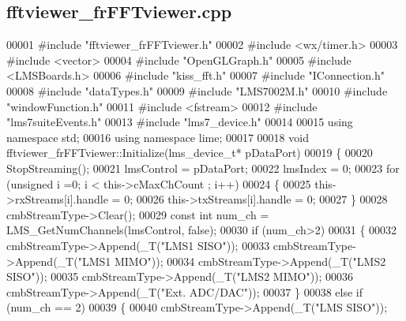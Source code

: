 \subsection{fftviewer\+\_\+fr\+F\+F\+Tviewer.\+cpp}
\label{fftviewer__frFFTviewer_8cpp_source}

\begin{DoxyCode}
00001 \textcolor{preprocessor}{#include "fftviewer_frFFTviewer.h"}
00002 \textcolor{preprocessor}{#include <wx/timer.h>}
00003 \textcolor{preprocessor}{#include <vector>}
00004 \textcolor{preprocessor}{#include "OpenGLGraph.h"}
00005 \textcolor{preprocessor}{#include <LMSBoards.h>}
00006 \textcolor{preprocessor}{#include "kiss\_fft.h"}
00007 \textcolor{preprocessor}{#include "IConnection.h"}
00008 \textcolor{preprocessor}{#include "dataTypes.h"}
00009 \textcolor{preprocessor}{#include "LMS7002M.h"}
00010 \textcolor{preprocessor}{#include "windowFunction.h"}
00011 \textcolor{preprocessor}{#include <fstream>}
00012 \textcolor{preprocessor}{#include "lms7suiteEvents.h"}
00013 \textcolor{preprocessor}{#include "lms7_device.h"}
00014 
00015 \textcolor{keyword}{using namespace }std;
00016 \textcolor{keyword}{using namespace }lime;
00017 
00018 \textcolor{keywordtype}{void} fftviewer_frFFTviewer::Initialize(lms_device_t* pDataPort)
00019 \{
00020     StopStreaming();
00021     lmsControl = pDataPort;
00022     lmsIndex = 0;
00023     \textcolor{keywordflow}{for} (\textcolor{keywordtype}{unsigned} i =0; i < this->cMaxChCount ; i++)
00024     \{
00025         this->rxStreams[i].handle = 0;
00026         this->txStreams[i].handle = 0;
00027     \}
00028     cmbStreamType->Clear();
00029     \textcolor{keyword}{const} \textcolor{keywordtype}{int} num\_ch = LMS_GetNumChannels(lmsControl, \textcolor{keyword}{false});
00030     \textcolor{keywordflow}{if} (num\_ch>2)
00031     \{
00032         cmbStreamType->Append(\_T(\textcolor{stringliteral}{"LMS1 SISO"}));
00033         cmbStreamType->Append(\_T(\textcolor{stringliteral}{"LMS1 MIMO"}));
00034         cmbStreamType->Append(\_T(\textcolor{stringliteral}{"LMS2 SISO"}));
00035         cmbStreamType->Append(\_T(\textcolor{stringliteral}{"LMS2 MIMO"}));
00036         cmbStreamType->Append(\_T(\textcolor{stringliteral}{"Ext. ADC/DAC"}));
00037     \}
00038     \textcolor{keywordflow}{else} \textcolor{keywordflow}{if} (num\_ch == 2)
00039     \{
00040         cmbStreamType->Append(\_T(\textcolor{stringliteral}{"LMS SISO"}));

\end{DoxyCode}
